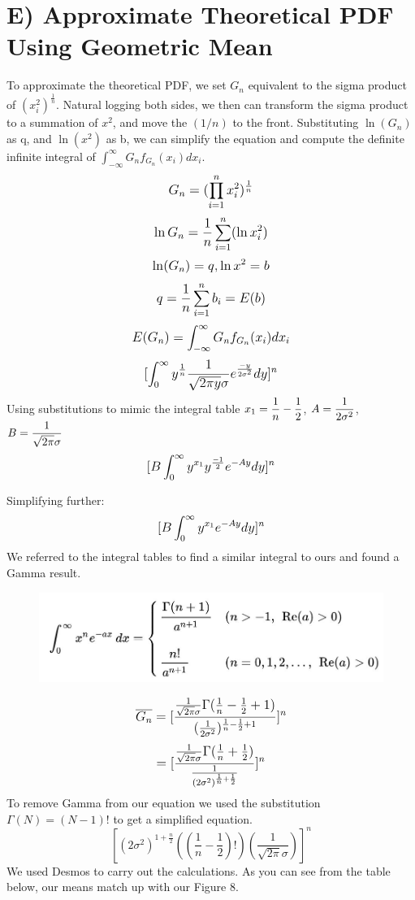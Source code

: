 \documentclass{article}
\begin{document}
\section*{E) Approximate Theoretical PDF Using Geometric Mean}
To approximate the theoretical PDF, we set $G_n$ equivalent to the sigma product of $(x^2_i)^\frac{1}{n}$. Natural logging both sides, we then can transform the sigma product to a summation of $x^2$, and move the $(1/n)$ to the front. Substituting $\ln(G_n)$ as q, and $\ln(x^2)$ as b, we can simplify the equation and compute the definite infinite integral of $\int_{-\infty}^{\infty} G_nf_{G_n}(x_i)dx_i$.
\[
\mathlarger{G_n = (\prod_{i = 1}^{n}x^2_i)^\frac{1}{n}}
\]
\[
\mathlarger{\ln{G_n} = \frac{1}{n}\sum_{i = 1}^{n}(\ln{x^2_i})}
\]
\[
\mathlarger{\ln(G_n) = q, \ln{x^2} = b}
\]
\[
\mathlarger{q = \frac{1}{n}\sum_{i = 1}^{n}b_i = E(b)}
\]
\[
\mathlarger{E(G_n) = \int_{-\infty}^{\infty}G_nf_{G_n}(x_i)dx_i}
\]
\[
\mathlarger{[\int_{0}^{\infty}y^\frac{1}{n}\frac{1}{\sqrt{2\pi y}\sigma}e^\frac{-y}{2\sigma^2}dy]^n}
\]
\center Using substitutions to mimic the integral table $\mathlarger{x_1 = \frac{1}{n}-\frac{1}{2}}$, $\mathlarger{A = \frac{1}{2\sigma^2}}$, $\mathlarger{B=\frac{1}{\sqrt{2\pi}\sigma}}$
\[
\mathlarger{[B\int_{0}^{\infty}y^{x_1} y^\frac{-1}{2}e^{-Ay}dy]^n}
\]
\raggedright Simplifying further:
\[
\mathlarger{[B\int_{0}^{\infty}y^{x_1}e^{-Ay}dy]^n}
\]
We referred to the integral tables to find a similar integral to ours and found a Gamma result.
\begin{figure}[h!]
\centering
\includegraphics[scale=0.75 ]{PartE_2.jpg}
\end{figure}
\[
\mathlarger{\overline{G_n} = [\frac{\frac{1}{\sqrt{2\pi}\sigma}\Gamma{(\frac{1}{n}-\frac{1}{2}+1})}{(\frac{1}{2\sigma^2})^{\frac{1}{n}-\frac{1}{2}+1}}]^n}
\]
\[
\mathlarger{=[\frac{\frac{1}{\sqrt{2\pi}\sigma}\Gamma{(\frac{1}{n}+\frac{1}{2}})}{\frac{1}{(2\sigma^2)^{\frac{1}{n}+\frac{1}{2}}}}]^n}
\]
To remove Gamma from our equation we used the substitution $\Gamma(N) = (N - 1)!$ to get a simplified equation.
\[
[(2\sigma^2)^{1+\frac{n}{2}}((\frac{1}{n}-\frac{1}{2})!)(\frac{1}{\sqrt{2\pi}\sigma})]^n
\]
We used Desmos to carry out the calculations. As you can see from the table below, our means match up with our Figure 8.
\end{document}
